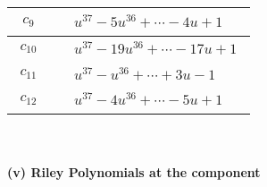 \documentclass[1p]{elsarticle_modified}
\theoremstyle{definition}
\begin{document}
\begin{tabular}{m{50pt}|m{274pt}}
\hline $$\begin{aligned}c_{9}\end{aligned}$$&$\begin{aligned}
&u^{37}-5 u^{36}+\cdots-4 u+1
\end{aligned}$\\
\hline $$\begin{aligned}c_{10}\end{aligned}$$&$\begin{aligned}
&u^{37}-19 u^{36}+\cdots-17 u+1
\end{aligned}$\\
\hline $$\begin{aligned}c_{11}\end{aligned}$$&$\begin{aligned}
&u^{37}- u^{36}+\cdots+3 u-1
\end{aligned}$\\
\hline $$\begin{aligned}c_{12}\end{aligned}$$&$\begin{aligned}
&u^{37}-4 u^{36}+\cdots-5 u+1
\end{aligned}$\\
\hline
\end{tabular}\\~\\
\newpage\renewcommand{\arraystretch}{1}
\flushleft \textbf{(v) Riley Polynomials at the component}\newline \\
\end{document}
